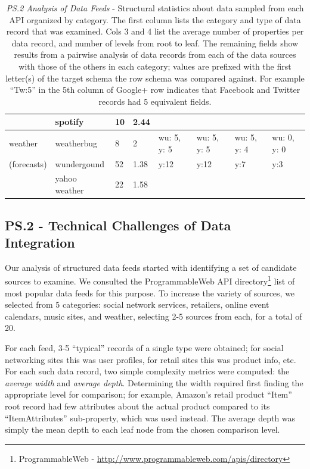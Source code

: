 \documentclass{sigchi}
\begin{document}
\begin{table}
\begin{tabular}{p{2.0cm}  p{1.8cm}  p{1.8cm}  p{1.8cm}  p{1.8cm}  p{1.8cm}  p{1.8cm}  p{1.8cm}}
				& spotify			& 10						& 2.44					&				&						&						& \\
\hline
weather			& weatherbug		& 8						& 2						& wu: 5, y: 5		& wu: 5, y: 5				& wu: 5, y: 4				& wu: 0, y: 0 \\
(forecasts)		& wundergound	& 52						& 1.38					& y:12			& y:12					& y:7						& y:3 \\
				& yahoo weather	& 22						& 1.58					&				&						&						& \\
\end{tabular}
\caption{\emph{PS.2 Analysis of Data Feeds} - Structural statistics about data sampled from each API organized by category.  The first column lists the category and type of data record that was examined.  Cols 3 and 4 list the average number of properties per data record, and number of levels from root to leaf. The remaining fields show results from a pairwise analysis of data records from each of the data sources with those of the others in each category; values are prefixed with the first letter(s) of the target schema the row schema was compared against. For example ``Tw:5'' in the 5th column of Google+ row indicates that Facebook and Twitter records had 5 equivalent fields. }\label{tbl:prestudy2}
\end{table}


\subsection{PS.2 - Technical Challenges of Data Integration}
Our analysis of structured data feeds started with identifying a set of candidate sources to examine.  We consulted the ProgrammableWeb API directory\footnote{ProgrammableWeb - \url{http://www.programmableweb.com/apis/directory}} list of most popular data feeds for this purpose.  To increase the variety of sources, we selected from 5 categories: social network services, retailers, online event calendars, music sites, and weather, selecting 2-5 sources from each, for a total of 20.  

For each feed, 3-5 ``typical'' records of a single type were obtained; for social networking sites this was user profiles, for retail sites this was product info, etc.
For each such data record, two simple complexity metrics were computed: the \emph{average width} and \emph{average depth}.  Determining the width required first finding the appropriate level for comparison; for example, Amazon's retail product ``Item'' root record had few attributes about the actual product compared to its ``ItemAttributes'' sub-property, which was used instead. The average depth was simply the mean depth to each leaf node from the chosen comparison level.
\end{document}
